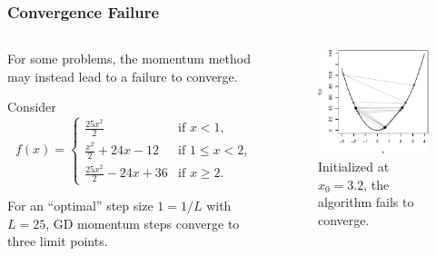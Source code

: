 \documentclass[aspectratio=1610,onlytextwidth]{beamer}
\begin{document}
\begin{frame}[c]
  \frametitle{Convergence Failure}

  \begin{columns}
    \begin{column}{0.45\textwidth}
      For some problems, the momentum method may instead lead to a failure to converge.

      \pause

      \bigskip

      Consider
      \[
        f(x) =
        \begin{cases}
          \frac{25x^2}{2}            & \text{if } x < 1,        \\
          \frac{x^2}{2} +24x - 12    & \text{if } 1 \leq x < 2, \\
          \frac{25x^2}{2} - 24x + 36 & \text{if } x \geq 2.
        \end{cases}
      \]

      \pause
      \bigskip

      For an ``optimal'' step size $1 = 1/ L$ with $L = 25$, GD
      momentum steps converge to three limit points.

    \end{column}
    \begin{column}{0.45\textwidth}
      \begin{figure}[htpb]
        \centering
        \includegraphics[]{images/momentum-failure.pdf}
        \caption{%
          Initialized at $x_0 = 3.2$, the algorithm fails to converge.
        }
      \end{figure}
    \end{column}
  \end{columns}
\end{frame}
\end{document}
